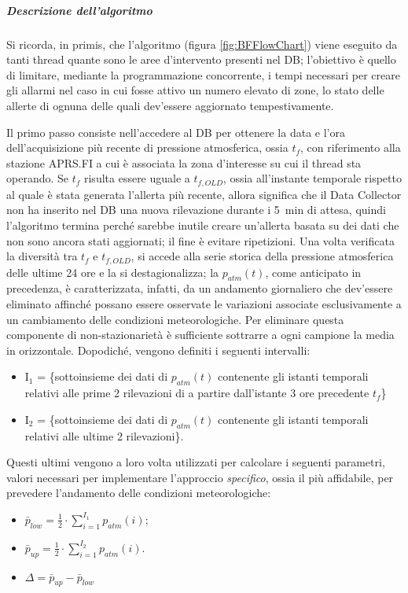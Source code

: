 \subparagraph{Descrizione dell'algoritmo} Si ricorda, in primis, che l'algoritmo (figura \ref{fig:BFFlowChart}) viene eseguito da tanti thread quante sono le aree d'intervento presenti nel DB; l'obiettivo è quello di limitare, mediante la programmazione concorrente, i tempi necessari per creare gli allarmi nel caso in cui fosse attivo un numero elevato di zone, lo stato delle allerte di ognuna delle quali dev'essere aggiornato tempestivamente.
\par Il primo passo consiste nell'accedere al DB per ottenere la data e l'ora dell'acquisizione più recente di pressione atmosferica, ossia $t_{f}$, con riferimento alla stazione APRS.FI a cui  è associata la zona d'interesse su cui il thread sta operando. Se $t_{f}$ risulta essere uguale a $t_{f,OLD}$, ossia all'instante temporale rispetto al quale è stata generata l'allerta più recente, allora significa che il Data Collector non ha inserito nel DB una nuova rilevazione durante i \SI{5}{\minute} di attesa, quindi l'algoritmo termina perché sarebbe inutile creare un'allerta basata su dei dati che non sono ancora stati aggiornati; il fine è evitare ripetizioni. Una volta verificata la diversità tra $t_{f}$ e $t_{f,OLD}$, si accede alla serie storica della pressione atmosferica delle ultime 24 ore e la si destagionalizza; la $p_{atm}(t)$, come anticipato in precedenza, è caratterizzata, infatti, da un andamento giornaliero che dev'essere eliminato affinché possano essere osservate le variazioni associate esclusivamente a un cambiamento delle condizioni meteorologiche. Per eliminare questa componente di non-stazionarietà è sufficiente sottrarre a ogni campione la media in orizzontale. Dopodiché, vengono definiti i seguenti intervalli:
\begin{itemize}
	\item I$_1$ = \{sottoinsieme dei dati di $p_{atm}(t)$ contenente gli istanti temporali relativi alle prime 2 rilevazioni di a partire dall'istante 3 ore precedente $t_f$\}
	\item I$_2$ = \{sottoinsieme dei dati di $p_{atm}(t)$ contenente gli istanti temporali relativi alle ultime 2 rilevazioni\}.
\end{itemize}
Questi ultimi vengono a loro volta utilizzati per calcolare i seguenti parametri, valori necessari per implementare l'approccio \textit{specifico}, ossia il più affidabile, per prevedere l'andamento delle condizioni meteorologiche:
\begin{itemize}
	\item $\bar{p}_{low} = \frac{1}{2} \cdot \sum_{i = 1}^{I_1} p_{atm}(i)$;
	\item $\bar{p}_{up} = \frac{1}{2} \cdot \sum_{i = 1}^{I_2} p_{atm}(i)$.
	\item $\Delta = \bar{p}_{up} - \bar{p}_{low}$	
\end{itemize}
